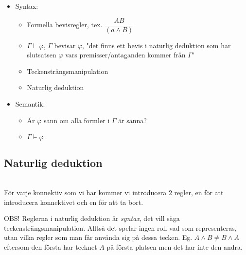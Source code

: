 \begin{itemize}
  \item Syntax:
    \begin{itemize}
      \item Formella bevisregler, tex. $\dfrac{A  B}{(a\wedge B)}$
      \item $\Gamma\vdash\varphi$, $\Gamma$ bevisar $\varphi$, "det finns ett bevis i naturlig deduktion som har slutsatsen $\varphi$ vars premisser/antaganden kommer från $\Gamma$"
      \item Teckensträngsmanipulation
      \item Naturlig deduktion
    \end{itemize}
  \item Semantik:
    \begin{itemize}
      \item Är $\varphi$ sann om alla formler i $\Gamma$ är sanna?
      \item $\Gamma\vDash\varphi$
    \end{itemize}
\end{itemize}
\par\bigskip

\subsection{Naturlig deduktion}\hfill\\

\noindent För varje konnektiv som vi har kommer vi introducera 2 regler, en för att introducera konnektivet och en för att ta bort.
\par\bigskip
\noindent OBS! Reglerna i naturlig deduktion är \textit{syntax}, det vill säga teckensträngsmanipulation. Alltså det spelar ingen roll vad som representeras, utan vilka regler som man får använda sig på dessa tecken. Eg. $A\wedge B \neq B\wedge A$ eftersom den första har tecknet $A$ på första platsen men det har inte den andra.

